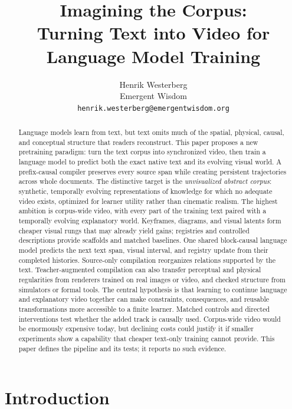 \documentclass[11pt]{article}
\title{Imagining the Corpus:\\Turning Text into Video for Language Model Training}
\author{Henrik Westerberg\\Emergent Wisdom\\
  \texttt{henrik.westerberg@emergentwisdom.org}}
\begin{document}
\maketitle

\begin{abstract}
Language models learn from text, but text omits much of the spatial, physical, causal, and conceptual structure that readers reconstruct. This paper proposes a new pretraining paradigm: turn the text corpus into synchronized video, then train a language model to predict both the exact native text and its evolving visual world. A prefix-causal compiler preserves every source span while creating persistent trajectories across whole documents. The distinctive target is the \emph{unvisualized abstract corpus}: synthetic, temporally evolving representations of knowledge for which no adequate video exists, optimized for learner utility rather than cinematic realism. The highest ambition is corpus-wide video, with every part of the training text paired with a temporally evolving explanatory world. Keyframes, diagrams, and visual latents form cheaper visual rungs that may already yield gains; registries and controlled descriptions provide scaffolds and matched baselines. One shared block-causal language model predicts the next text span, visual interval, and registry update from their completed histories. Source-only compilation reorganizes relations supported by the text. Teacher-augmented compilation can also transfer perceptual and physical regularities from renderers trained on real images or video, and checked structure from simulators or formal tools. The central hypothesis is that learning to continue language and explanatory video together can make constraints, consequences, and reusable transformations more accessible to a finite learner. Matched controls and directed interventions test whether the added track is causally used. Corpus-wide video would be enormously expensive today, but declining costs could justify it if smaller experiments show a capability that cheaper text-only training cannot provide. This paper defines the pipeline and its tests; it reports no such evidence.
\end{abstract}


\section{Introduction}
\end{document}
